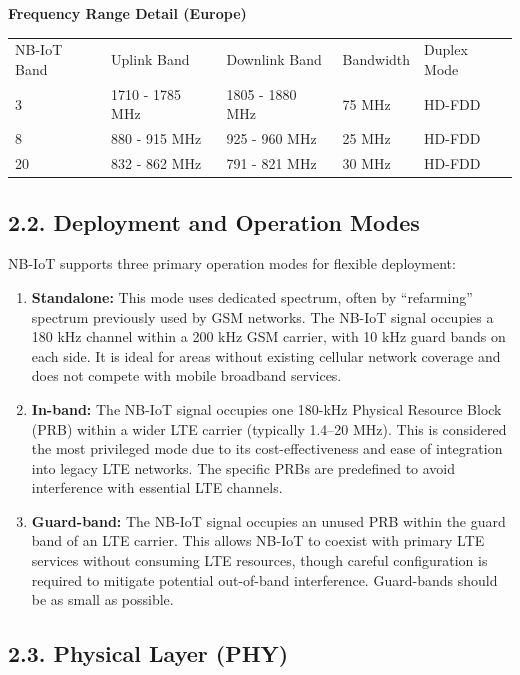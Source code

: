 \documentclass[a4paper, 12pt]{book} %
\begin{document}
\textbf{Frequency Range Detail (Europe)}

\begin{longtable}[]{@{}lllll@{}}
\toprule\noalign{}
\endhead
\bottomrule\noalign{}
\endlastfoot
NB-IoT Band & Uplink Band & Downlink Band & Bandwidth & Duplex Mode \\
3 & 1710 - 1785 MHz & 1805 - 1880 MHz & 75 MHz & HD-FDD \\
8 & 880 - 915 MHz & 925 - 960 MHz & 25 MHz & HD-FDD \\
20 & 832 - 862 MHz & 791 - 821 MHz & 30 MHz & HD-FDD \\
\end{longtable}

\subsection{2.2. Deployment and Operation
Modes}\label{deployment-and-operation-modes}

NB-IoT supports three primary operation modes for flexible deployment:

\begin{enumerate}
\def\labelenumi{\arabic{enumi}.}
\tightlist
\item
  \textbf{Standalone:} This mode uses dedicated spectrum, often by
  ``refarming'' spectrum previously used by GSM networks. The NB-IoT
  signal occupies a 180 kHz channel within a 200 kHz GSM carrier, with
  10 kHz guard bands on each side. It is ideal for areas without
  existing cellular network coverage and does not compete with mobile
  broadband services.
\item
  \textbf{In-band:} The NB-IoT signal occupies one 180-kHz Physical
  Resource Block (PRB) within a wider LTE carrier (typically 1.4--20
  MHz). This is considered the most privileged mode due to its
  cost-effectiveness and ease of integration into legacy LTE networks.
  The specific PRBs are predefined to avoid interference with essential
  LTE channels.
\item
  \textbf{Guard-band:} The NB-IoT signal occupies an unused PRB within
  the guard band of an LTE carrier. This allows NB-IoT to coexist with
  primary LTE services without consuming LTE resources, though careful
  configuration is required to mitigate potential out-of-band
  interference. Guard-bands should be as small as possible.
\end{enumerate}

\subsection{2.3. Physical Layer (PHY)}\label{physical-layer-phy}
\end{document}
